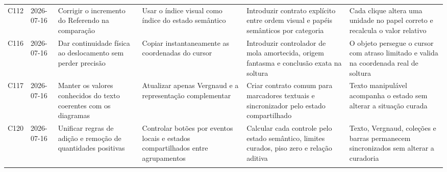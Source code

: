 \begin{landscape}
\begin{longtable}{p{1.0cm}p{1.9cm}p{4.0cm}p{5.0cm}p{6.2cm}p{5.7cm}}
\addlinespace[2pt]
C112 & 2026-07-16 & Corrigir o incremento do Referendo na comparação & Usar o índice visual como índice do estado semântico & Introduzir contrato explícito entre ordem visual e papéis semânticos por categoria & Cada clique altera uma unidade no papel correto e recalcula o valor relativo \\
\addlinespace[2pt]
C116 & 2026-07-16 & Dar continuidade física ao deslocamento sem perder precisão & Copiar instantaneamente as coordenadas do cursor & Introduzir controlador de mola amortecida, origem fantasma e conclusão exata na soltura & O objeto persegue o cursor com atraso limitado e valida na coordenada real de soltura \\
\addlinespace[2pt]
C117 & 2026-07-16 & Manter os valores conhecidos do texto coerentes com os diagramas & Atualizar apenas Vergnaud e a representação complementar & Criar contrato comum para marcadores textuais e sincronizador pelo estado compartilhado & Texto manipulável acompanha o estado sem alterar a situação curada \\
\addlinespace[2pt]
C120 & 2026-07-16 & Unificar regras de adição e remoção de quantidades positivas & Controlar botões por eventos locais e estados compartilhados entre agrupamentos & Calcular cada controle pelo estado semântico, limites curados, piso zero e relação aditiva & Texto, Vergnaud, coleções e barras permanecem sincronizados sem alterar a curadoria \\
\addlinespace[2pt]
\bottomrule
\end{longtable}
\endgroup
\end{landscape}
